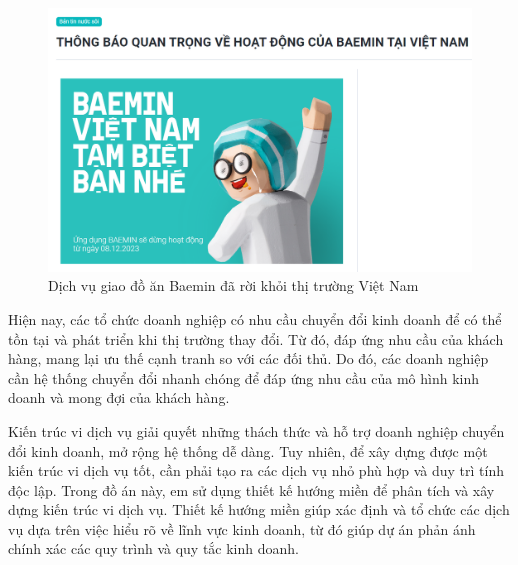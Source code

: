 \begin{figure}[H]

\centering

\includegraphics[scale = 0.5]{pictures/baemin/main.png}

\caption{Dịch vụ giao đồ ăn Baemin đã rời khỏi thị trường Việt Nam}

\end{figure}

Hiện nay, các tổ chức doanh nghiệp có nhu cầu chuyển đổi kinh doanh để có thể tồn tại và phát triển khi thị trường thay đổi. Từ đó, đáp ứng nhu cầu của khách hàng, mang lại ưu thế cạnh tranh so với các đối thủ. Do đó, các doanh nghiệp cần hệ thống chuyển đổi nhanh chóng để đáp ứng nhu cầu của mô hình kinh doanh và mong đợi của khách hàng.






Kiến trúc vi dịch vụ giải quyết những thách thức và hỗ trợ doanh nghiệp chuyển đổi kinh doanh, mở rộng hệ thống dễ dàng. Tuy nhiên, để xây dựng được một kiến trúc vi dịch vụ tốt, cần phải tạo ra các dịch vụ nhỏ phù hợp và duy trì tính độc lập. Trong đồ án này, em sử dụng thiết kế hướng miền để phân tích và xây dựng kiến trúc vi dịch vụ. Thiết kế hướng miền giúp xác định và tổ chức các dịch vụ dựa trên việc hiểu rõ về lĩnh vực kinh doanh, từ đó giúp dự án phản ánh chính xác các quy trình và quy tắc kinh doanh.

